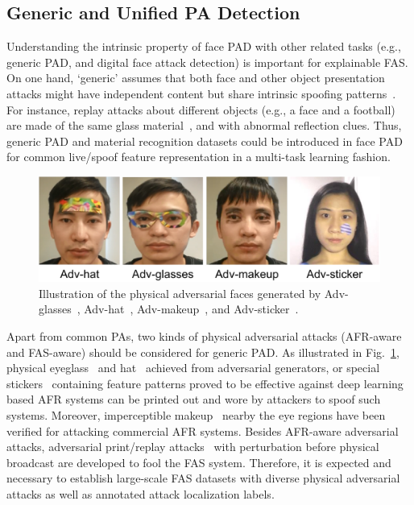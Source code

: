 \documentclass[10pt,journal,compsoc]{IEEEtran}
\begin{document}
\vspace{-0.9em}
\subsection{Generic and Unified PA Detection}
Understanding the intrinsic property of face PAD with other related tasks (e.g., generic PAD, and digital face attack detection) is important for explainable FAS. On one hand, `generic' assumes that both face and other object presentation attacks might have independent content but share intrinsic spoofing patterns~\cite{stehouwer2020noise}. For instance, replay attacks about different objects (e.g., a face and a football) are made of the same glass material~\cite{yu2020face}, and with abnormal reflection clues. Thus, generic PAD and material recognition datasets could be introduced in face PAD for common live/spoof feature representation in a multi-task learning fashion. 



\begin{figure}
\centering
\includegraphics[scale=0.48]{Figures/adv.pdf}
\vspace{-0.6em}
  \caption{ 
   Illustration of the physical adversarial faces generated by Adv-glasses~\cite{sharif2019general}, Adv-hat~\cite{komkov2021advhat}, Adv-makeup~\cite{yin2021adv}, and Adv-sticker~\cite{guo2021meaningful}.
  }
  \vspace{-0.9em}
\label{fig:adv}
\end{figure}


Apart from common PAs, two kinds of physical adversarial attacks (AFR-aware and FAS-aware) should be considered for generic PAD. As illustrated in Fig.~\ref{fig:adv}, physical  eyeglass~\cite{sharif2019general} and hat~\cite{komkov2021advhat} achieved from adversarial generators, or
special stickers~\cite{guo2021meaningful} containing feature patterns proved to be effective against deep learning based AFR systems can be printed out and wore by attackers to spoof such systems. Moreover, imperceptible makeup~\cite{yin2021adv} nearby the eye regions have been verified for attacking commercial AFR systems. Besides AFR-aware adversarial attacks, adversarial print/replay attacks~\cite{zhang2019attacking} with perturbation before physical broadcast are developed to fool the FAS system. Therefore, it is expected and necessary to establish large-scale FAS datasets with diverse physical adversarial attacks as well as annotated attack localization labels. 
\end{document}
